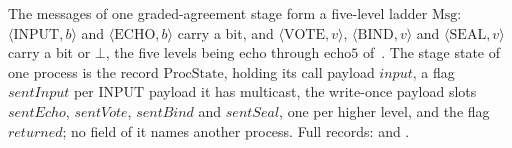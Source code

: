 \begin{definition}
  \label{def:aba-gbca-vocab}
  \leanok
  The messages of one graded-agreement stage form a five-level ladder $\mathrm{Msg}$: $\langle\mathrm{INPUT},b\rangle$ and $\langle\mathrm{ECHO},b\rangle$ carry a bit, and $\langle\mathrm{VOTE},v\rangle$, $\langle\mathrm{BIND},v\rangle$ and $\langle\mathrm{SEAL},v\rangle$ carry a bit or $\bot$, the five levels being $\mathrm{echo}$ through $\mathrm{echo5}$ of~\cite{ABDY22}.
  The stage state of one process is the record $\mathrm{ProcState}$, holding its call payload $\mathit{input}$, a flag $\mathit{sentInput}$ per $\mathrm{INPUT}$ payload it has multicast, the write-once payload slots $\mathit{sentEcho}$, $\mathit{sentVote}$, $\mathit{sentBind}$ and $\mathit{sentSeal}$, one per higher level, and the flag $\mathit{returned}$; no field of it names another process.
  Full records:  and .
\end{definition}
